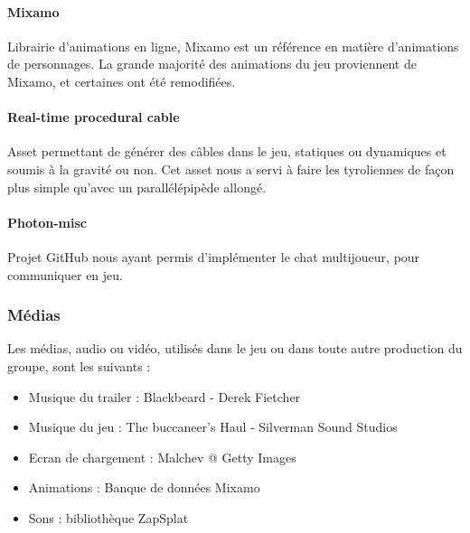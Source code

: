         \paragraph{Mixamo} Librairie d'animations en ligne, Mixamo est un référence en matière d'animations de personnages. La grande 
        majorité des animations du jeu proviennent de Mixamo, et certaines ont été remodifiées.

        \paragraph{Real-time procedural cable} Asset permettant de générer des câbles dans le jeu, statiques ou dynamiques et soumis 
        à la gravité ou non. Cet asset nous a servi à faire les tyroliennes de façon plus simple qu'avec un parallélépipède allongé. 

        \paragraph{Photon-misc} Projet GitHub nous ayant permis d'implémenter le chat multijoueur, pour communiquer en jeu.

        
    \subsubsection{Médias}

        Les médias, audio ou vidéo, utilisés dans le jeu ou dans toute autre production du groupe, sont les suivants :

        \begin{itemize}
            \item Musique du trailer : Blackbeard - Derek Fietcher
            \item Musique du jeu : The buccaneer's Haul - Silverman Sound Studios
            \item Ecran de chargement : Malchev @ Getty Images
            \item Animations : Banque de données Mixamo
            \item Sons : bibliothèque ZapSplat
        \end{itemize}